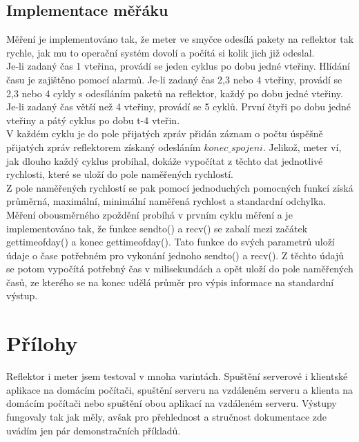 \documentclass[11pt]{article}
\begin{document}
		\subsection{Implementace měřáku}
			\begin{flushleft}
				Měření je implementováno tak, že meter ve smyčce odesílá pakety na reflektor tak rychle, jak mu to operační systém dovolí a počítá si kolik jich již odeslal.\\[0.5 cm]
				Je-li zadaný čas 1 vteřina, provádí se jeden cyklus po dobu jedné vteřiny. Hlídání času je zajištěno pomocí alarmů. Je-li zadaný čas 2,3 nebo 4 vteřiny, provádí se 2,3 nebo 4 cykly s odesíláním paketů na reflektor, každý po dobu jedné vteřiny. Je-li zadaný čas větší než 4 vteřiny, provádí se 5 cyklů. První čtyři po dobu jedné vteřiny a pátý cyklus po dobu t-4 vteřin.\\[0.5 cm]
				V každém cyklu je do pole přijatých zpráv přidán záznam o počtu úspěšně přijatých zpráv reflektorem získaný odesláním $konec\_spojeni$. Jelikož, meter ví, jak dlouho každý cyklus probíhal, dokáže vypočítat z těchto dat jednotlivé rychlosti, které se uloží do pole naměřených rychlostí.\\[0.5 cm]
				Z pole naměřených rychlostí se pak pomocí jednoduchých pomocných funkcí získá průměrná, maximální, minimální naměřená rychlost a standardní odchylka.\\[0.5 cm]
				Měření obousměrného zpoždění probíhá v prvním cyklu měření a je implementováno tak, že funkce sendto() a recv() se zabalí mezi začátek gettimeofday() a konec gettimeofday(). Tato funkce do svých parametrů uloží údaje o čase potřebném pro vykonání jednoho sendto() a recv(). Z těchto údajů se potom vypočítá potřebný čas v milisekundách a opět uloží do pole naměřených časů, ze kterého se na konec udělá průměr pro výpis informace na standardní výstup.
							
			\end{flushleft}	

	
	\newpage		
	\section{Přílohy}
			Reflektor i meter jsem testoval v mnoha varintách. Spuštění serverové i klientské aplikace na domácím počítači, spuštění serveru na vzdáleném serveru a klienta na domácím počítači nebo spuštění obou aplikací na vzdáleném serveru. Výstupy fungovaly tak jak měly, avšak pro přehlednost a stručnost dokumentace zde uvádím jen pár demonstračních příkladů.
\end{document}
